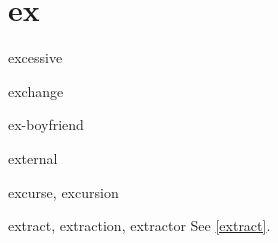 \chapter{ex}

\begin{word}{excessive}
\end{word}

\begin{word}{exchange}
\end{word}

\begin{word}{ex-boyfriend}
\end{word}

\begin{word}{external}
\end{word}

\begin{word}{excurse, excursion}
\end{word}

\begin{word}{extract, extraction, extractor}
    See \ref{extract}.
\end{word}